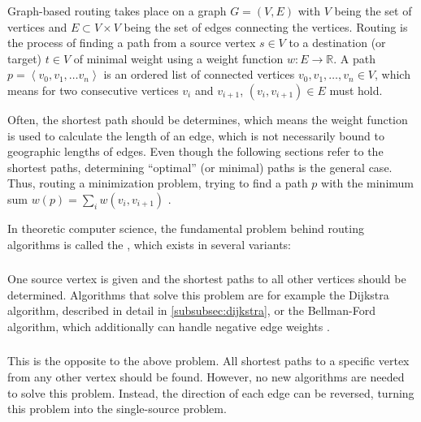 		Graph-based routing takes place on a graph $G=(V, E)$ with $V$ being the set of vertices and $E \subset V \times V$ being the set of edges connecting the vertices.
		Routing is the process of finding a path from a source vertex $s \in V$ to a destination (or target) $t \in V$ of minimal weight using a weight function $w: E \rightarrow \mathbb{R}$.
		A path $p=\left\langle v_0, v_1, \dots v_n \right\rangle$ is an ordered list of connected vertices $v_0, v_1, \dots, v_n \in V$, which means for two consecutive vertices $v_i$ and $v_{i+1}$, $(v_i, v_{i+1}) \in E$ must hold.
		
		Often, the shortest path should be determines, which means the weight function is used to calculate the length of an edge, which is not necessarily bound to geographic lengths of edges.
		Even though the following sections refer to the shortest paths, determining \enquote{optimal} (or minimal) paths is the general case.
		Thus, routing a minimization problem, trying to find a path $p$ with the minimum sum $w(p) = \sum_i{w(v_i, v_{i+1})}$ \cite[645]{cormen-introduction-to-alg}.
		
		In theoretic computer science, the fundamental problem behind routing algorithms is called the , which exists in several variants\cite[644]{cormen-introduction-to-alg}:
		
		\subsubsection{}
		\label{subsubsec:single-source-shortest-path}
		
			One source vertex is given and the shortest paths to all other vertices should be determined.
			Algorithms that solve this problem are for example the Dijkstra algorithm, described in detail in \cref{subsubsec:dijkstra}, or the Bellman-Ford algorithm, which additionally can handle negative edge weights \cite[651]{cormen-introduction-to-alg}.
		
		\subsubsection{}
		
			This is the opposite to the above problem.
			All shortest paths to a specific vertex from any other vertex should be found.
			However, no new algorithms are needed to solve this problem.
			Instead, the direction of each edge can be reversed, turning this problem into the single-source problem.
		
